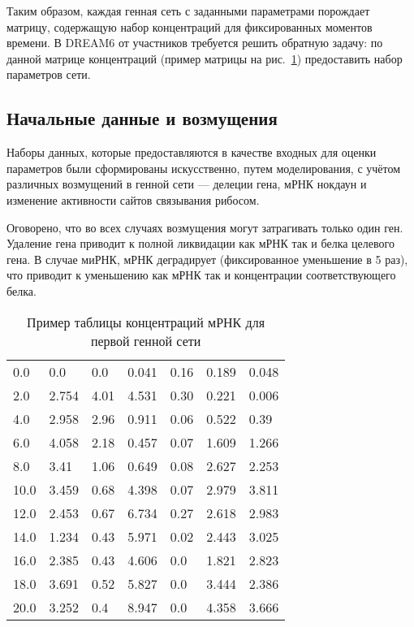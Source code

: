 Таким образом, каждая генная сеть с заданными параметрами порождает матрицу, 
содержащую набор концентраций для фиксированных моментов времени. В DREAM6 от
участников требуется решить обратную задачу: по данной матрице концентраций 
(пример матрицы на рис.~\ref{img:mRNAtable}) предоставить набор параметров сети.

\subsection{Начальные данные и возмущения} \label{sect2_2_3}

Наборы данных, которые предоставляются в качестве входных для оценки параметров 
были сформированы искусственно, путем моделирования, с учётом различных 
возмущений в генной сети — делеции гена, мРНК нокдаун и изменение активности 
сайтов связывания рибосом. 

Оговорено, что во всех случаях возмущения могут затрагивать только один ген. 
Удаление гена приводит к полной ликвидации как мРНК так и белка целевого гена. 
В случае миРНК, мРНК деградирует (фиксированное уменьшение в 5 раз), что 
приводит к уменьшению как мРНК так и концентрации соответствующего белка.

\begin{table}[h]
  \centering
    \begin{tabular}{l|llllll}
        0.0	  & 0.0    & 0.0   & 0.041  & 0.16  & 0.189  & 0.048 \\
        2.0	  & 2.754  & 4.01  & 4.531  & 0.30  & 0.221  & 0.006 \\
        4.0	  & 2.958  & 2.96  & 0.911  & 0.06  & 0.522  & 0.39  \\
        6.0	  & 4.058  & 2.18  & 0.457  & 0.07  & 1.609  & 1.266 \\
        8.0	  & 3.41   & 1.06  & 0.649  & 0.08  & 2.627  & 2.253 \\
        10.0  & 3.459  & 0.68  & 4.398  & 0.07  & 2.979  & 3.811 \\
        12.0  & 2.453  & 0.67  & 6.734  & 0.27  & 2.618  & 2.983 \\
        14.0  & 1.234  & 0.43  & 5.971  & 0.02  & 2.443  & 3.025 \\
        16.0  & 2.385  & 0.43  & 4.606  & 0.0   & 1.821  & 2.823 \\
        18.0  & 3.691  & 0.52  & 5.827  & 0.0   & 3.444  & 2.386 \\
        20.0  & 3.252  & 0.4   & 8.947  & 0.0   & 4.358  & 3.666 
    \end{tabular}
  \caption{Пример таблицы концентраций мРНК для первой генной сети}
  \label{img:mRNAtable}
\end{table}

